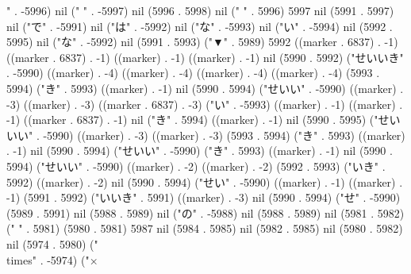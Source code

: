" . -5996) nil (" " . -5997) nil (5996 . 5998) nil (" " . 5996) 5997 nil (5991 . 5997) nil ("で" . -5991) nil ("は" . -5992) nil ("な" . -5993) nil ("い" . -5994) nil (5992 . 5995) nil ("な" . -5992) nil (5991 . 5993) ("▼" . 5989) 5992 ((marker . 6837) . -1) ((marker . 6837) . -1) ((marker) . -1) ((marker) . -1) nil (5990 . 5992) ("せいいき" . -5990) ((marker) . -4) ((marker) . -4) ((marker) . -4) ((marker) . -4) (5993 . 5994) ("き" . 5993) ((marker) . -1) nil (5990 . 5994) ("せいい" . -5990) ((marker) . -3) ((marker) . -3) ((marker . 6837) . -3) ("い" . -5993) ((marker) . -1) ((marker) . -1) ((marker . 6837) . -1) nil ("き" . 5994) ((marker) . -1) nil (5990 . 5995) ("せいいい" . -5990) ((marker) . -3) ((marker) . -3) (5993 . 5994) ("き" . 5993) ((marker) . -1) nil (5990 . 5994) ("せいい" . -5990) ("き" . 5993) ((marker) . -1) nil (5990 . 5994) ("せいい" . -5990) ((marker) . -2) ((marker) . -2) (5992 . 5993) ("いき" . 5992) ((marker) . -2) nil (5990 . 5994) ("せい" . -5990) ((marker) . -1) ((marker) . -1) (5991 . 5992) ("いいき" . 5991) ((marker) . -3) nil (5990 . 5994) ("せ" . -5990) (5989 . 5991) nil (5988 . 5989) nil ("の" . -5988) nil (5988 . 5989) nil (5981 . 5982) (" " . 5981) (5980 . 5981) 5987 nil (5984 . 5985) nil (5982 . 5985) nil (5980 . 5982) nil (5974 . 5980) ("\\times" . -5974) ("×
